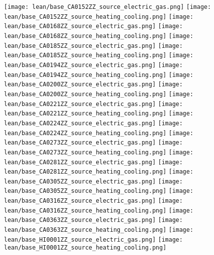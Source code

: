 \texttt{[image: lean/base\_CA0152ZZ\_source\_electric\_gas.png]}
\texttt{[image: lean/base\_CA0152ZZ\_source\_heating\_cooling.png]}
\texttt{[image: lean/base\_CA0168ZZ\_source\_electric\_gas.png]}
\texttt{[image: lean/base\_CA0168ZZ\_source\_heating\_cooling.png]}
\texttt{[image: lean/base\_CA0185ZZ\_source\_electric\_gas.png]}
\texttt{[image: lean/base\_CA0185ZZ\_source\_heating\_cooling.png]}
\texttt{[image: lean/base\_CA0194ZZ\_source\_electric\_gas.png]}
\texttt{[image: lean/base\_CA0194ZZ\_source\_heating\_cooling.png]}
\texttt{[image: lean/base\_CA0200ZZ\_source\_electric\_gas.png]}
\texttt{[image: lean/base\_CA0200ZZ\_source\_heating\_cooling.png]}
\texttt{[image: lean/base\_CA0221ZZ\_source\_electric\_gas.png]}
\texttt{[image: lean/base\_CA0221ZZ\_source\_heating\_cooling.png]}
\texttt{[image: lean/base\_CA0224ZZ\_source\_electric\_gas.png]}
\texttt{[image: lean/base\_CA0224ZZ\_source\_heating\_cooling.png]}
\texttt{[image: lean/base\_CA0273ZZ\_source\_electric\_gas.png]}
\texttt{[image: lean/base\_CA0273ZZ\_source\_heating\_cooling.png]}
\texttt{[image: lean/base\_CA0281ZZ\_source\_electric\_gas.png]}
\texttt{[image: lean/base\_CA0281ZZ\_source\_heating\_cooling.png]}
\texttt{[image: lean/base\_CA0305ZZ\_source\_electric\_gas.png]}
\texttt{[image: lean/base\_CA0305ZZ\_source\_heating\_cooling.png]}
\texttt{[image: lean/base\_CA0316ZZ\_source\_electric\_gas.png]}
\texttt{[image: lean/base\_CA0316ZZ\_source\_heating\_cooling.png]}
\texttt{[image: lean/base\_CA0363ZZ\_source\_electric\_gas.png]}
\texttt{[image: lean/base\_CA0363ZZ\_source\_heating\_cooling.png]}
\texttt{[image: lean/base\_HI0001ZZ\_source\_electric\_gas.png]}
\texttt{[image: lean/base\_HI0001ZZ\_source\_heating\_cooling.png]}
